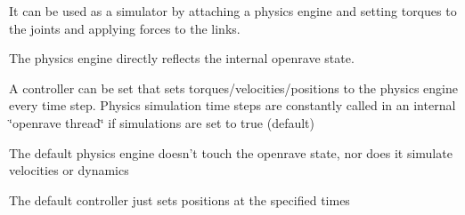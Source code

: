 \begin{DoxyItemize}
\item It can be used as a simulator by attaching a physics engine and setting torques to the joints and applying forces to the links.
\end{DoxyItemize}


\begin{DoxyItemize}
\item The physics engine directly reflects the internal openrave state.
\end{DoxyItemize}


\begin{DoxyItemize}
\item A controller can be set that sets torques/velocities/positions to the physics engine every time step. Physics simulation time steps are constantly called in an internal \char`\"{}openrave thread\char`\"{} if simulations are set to true (default)
\end{DoxyItemize}


\begin{DoxyItemize}
\item The default physics engine doesn't touch the openrave state, nor does it simulate velocities or dynamics
\end{DoxyItemize}


\begin{DoxyItemize}
\item The default controller just sets positions at the specified times
\end{DoxyItemize}

